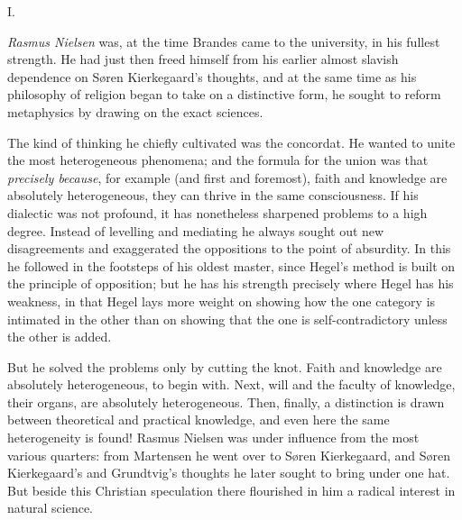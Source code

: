 \documentclass[12pt,a4paper,openany]{book}
\newcommand{\opage}[1]{\marginnote{\footnotesize\textit{[#1]}}}
\begin{document}
\opage{146}\setcounter{footnote}{0}%

\begin{center}I.\end{center}

\emph{Rasmus Nielsen} was, at the time Brandes came to the university, in his fullest strength. He had just then
freed himself from his earlier almost slavish dependence on Søren Kierkegaard's thoughts, and at the same time as
his philosophy of religion began to take on a distinctive form, he sought to reform metaphysics by drawing on the
exact sciences.

The kind of thinking he chiefly cultivated was the concordat. He wanted to unite the most heterogeneous
phenomena; and the formula for the union was that \emph{precisely because}, for example (and first and foremost),
faith and knowledge are absolutely heterogeneous, they can thrive in the same consciousness. If his dialectic was
not profound, it has nonetheless sharpened problems to a high degree. Instead of levelling and mediating he always
sought out new disagreements and exaggerated the oppositions to the point of absurdity. In this he followed in the
footsteps of his oldest master, since Hegel's method is built on the principle of opposition; but he has his
strength precisely where Hegel has his weakness, in that Hegel lays more weight on showing how the one category is
intimated in the other than on showing that the one is self-contradictory unless the other is added.

But he solved the problems only by cutting the knot. Faith and knowledge are absolutely heterogeneous, to begin
with. Next, will and the faculty of knowledge, their organs, are absolutely heterogeneous. Then, finally, a
distinction is drawn between theoretical and practical knowledge, and even here the same heterogeneity is found!
Rasmus Nielsen was under influence from the most various quarters: from Martensen he went over to Søren
Kierkegaard, and Søren Kierkegaard's and Grundtvig's thoughts he later sought to bring under one hat. But beside
this Christian speculation there flourished in him a radical interest in natural science.
\end{document}
